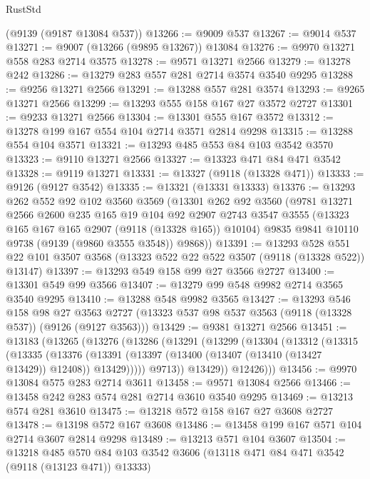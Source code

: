 \begin{lexlean}{RustStd}
\begin{coremodule}
    (@9139 (@9187 @13084 @537))
@13266 := @9009 @537
@13267 := @9014 @537
@13271 := @9007 (@13266 (@9895 @13267)) @13084
@13276 := @9970 @13271 @558 @283 @2714 @3575
@13278 := @9571 @13271 @2566
@13279 := @13278 @242
@13286 := @13279 @283 @557 @281 @2714 @3574 @3540 @9295
@13288 := @9256 @13271 @2566
@13291 := @13288 @557 @281 @3574
@13293 := @9265 @13271 @2566
@13299 := @13293 @555 @158 @167 @27 @3572 @2727
@13301 := @9233 @13271 @2566
@13304 := @13301 @555 @167 @3572
@13312 := @13278 @199 @167 @554 @104 @2714 @3571 @2814 @9298
@13315 := @13288 @554 @104 @3571
@13321 := @13293 @485 @553 @84 @103 @3542 @3570
@13323 := @9110 @13271 @2566
@13327 := @13323 @471 @84 @471 @3542
@13328 := @9119 @13271
@13331 := @13327 (@9118 (@13328 @471))
@13333 := @9126 (@9127 @3542)
@13335 := @13321 (@13331 @13333)
@13376 := @13293
    @262
    @552
    @92
    @102
    @3560
    @3569
    (@13301
      @262
      @92
      @3560
      (@9781
        @13271
        @2566
        @2600
        @235
        @165
        @19
        @104
        @92
        @2907
        @2743
        @3547
        @3555
        (@13323 @165 @167 @165 @2907 (@9118 (@13328 @165)) @10104)
        @9835
        @9841
        @10110
        @9738
        (@9139 (@9860 @3555 @3548))
        @9868))
@13391 := @13293
    @528
    @551
    @22
    @101
    @3507
    @3568
    (@13323 @522 @22 @522 @3507 (@9118 (@13328 @522)) @13147)
@13397 := @13293 @549 @158 @99 @27 @3566 @2727
@13400 := @13301 @549 @99 @3566
@13407 := @13279 @99 @548 @9982 @2714 @3565 @3540 @9295
@13410 := @13288 @548 @9982 @3565
@13427 := @13293
    @546
    @158
    @98
    @27
    @3563
    @2727
    (@13323 @537 @98 @537 @3563 (@9118 (@13328 @537)) (@9126 (@9127 @3563)))
@13429 := @9381 @13271 @2566
@13451 := @13183
    (@13265
      (@13276
        (@13286
          (@13291
            (@13299
              (@13304
                (@13312
                  (@13315
                    (@13335
                      (@13376
                        (@13391
                          (@13397 (@13400 (@13407 (@13410 (@13427 @13429)) @12408)) @13429)))))
                  @9713))
              @13429))
          @12426)))
@13456 := @9970 @13084 @575 @283 @2714 @3611
@13458 := @9571 @13084 @2566
@13466 := @13458 @242 @283 @574 @281 @2714 @3610 @3540 @9295
@13469 := @13213 @574 @281 @3610
@13475 := @13218 @572 @158 @167 @27 @3608 @2727
@13478 := @13198 @572 @167 @3608
@13486 := @13458 @199 @167 @571 @104 @2714 @3607 @2814 @9298
@13489 := @13213 @571 @104 @3607
@13504 := @13218
    @485
    @570
    @84
    @103
    @3542
    @3606
    (@13118 @471 @84 @471 @3542 (@9118 (@13123 @471)) @13333)

\end{coremodule}
\end{lexlean}
